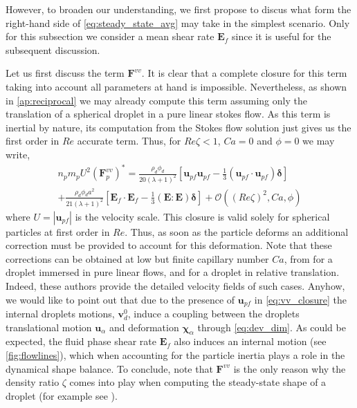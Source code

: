 However, to broaden our understanding, we first propose to discus what form the right-hand side of \ref{eq:steady_state_avg} may take in the simplest scenario. 
Only for this subsection we consider a mean shear rate $\textbf{E}_f$ since it is useful for the subsequent discussion. 

Let us first discuss the term $\textbf{F}^{vv}$. 
It is clear that a complete closure for this term taking into account all parameters at hand is impossible. 
Nevertheless, as shown in \ref{ap:reciprocal} we may already compute this term assuming only the translation of a spherical droplet in a pure linear stokes flow. 
As this term is inertial by nature, its computation from the Stokes flow solution just gives us the first order in $Re$ accurate term.
Thus, for $Re \zeta < 1$, $Ca = 0$ and $\phi = 0$ we may write,
\begin{multline}
    n_p m_p U^2 (\textbf{F}^{vv}_p)^*
    = 
    \frac{\rho_d \phi_d}{20(\lambda +1 )^2}
    \left[
        \textbf{u}_{p f}\textbf{u}_{p f} 
    -\frac{1}{3} (\textbf{u}_{p f}\cdot \textbf{u}_{p f})\bm\delta
    \right]\\
    + \frac{\rho_d \phi_d a^2}{21 (\lambda + 1)^2}[\textbf{E}_f\cdot \textbf{E}_f - \frac{1}{3}(\textbf{E}:\textbf{E})\bm\delta]
    + \mathcal{O}((Re\zeta)^2,Ca, \phi)
    \label{eq:vv_closure}
\end{multline}
where $U = |\textbf{u}_{pf}|$ is the velocity scale. 
This closure is valid solely for spherical particles at first order in $Re$. 
Thus, as soon as the particle deforms an additional correction must be provided to account for this deformation. 
Note that these corrections can be obtained at low but finite capillary number $Ca$, from \citet{leal2007advanced} for a droplet immersed in pure linear flows, and \citet{taylor1964deformation} for a droplet in relative translation. 
Indeed, these authors provide the detailed velocity fields of such cases. 
Anyhow, we would like to point out that due to the presence of $\textbf{u}_{p f}$ in \ref{eq:vv_closure} the internal droplets motions, $\textbf{v}_d^0$, induce a coupling between the droplets translational motion $\textbf{u}_\alpha$ and deformation $\bm\chi_\alpha$ through \ref{eq:dev_dim}. 
As could be expected, the fluid phase shear rate $\textbf{E}_f$ also induces an internal motion (see \ref{fig:flowlines}), which when accounting for the particle inertia plays a role in the dynamical shape balance.  
To conclude, note that $\textbf{F}^{vv}$ is the only reason why the density ratio $\zeta$ comes into play when computing the steady-state shape of a droplet (for example see \citet{taylor1964deformation}). 

